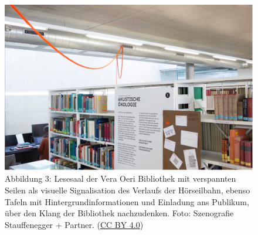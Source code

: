 \documentclass[a4paper,
fontsize=11pt,
oneside,
numbers=noperiodatend,
parskip=half-,
bibliography=totoc,
final
]{scrartcl}
\begin{document}
\begin{figure}[h]
\centering
\includegraphics{img/Abb3.jpg}
\caption{Abbildung 3: Lesesaal der Vera Oeri Bibliothek mit verspannten
Seilen als visuelle Signalisation des Verlaufs der Hörseilbahn, ebenso
Tafeln mit Hintergrundinformationen und Einladung ans Publikum, über den
Klang der Bibliothek nachzudenken. Foto: Szenografie Stauffenegger +
Partner. (\href{https://creativecommons.org/licenses/by/4.0/}{CC BY 4.0})}
\end{figure}
\end{document}
